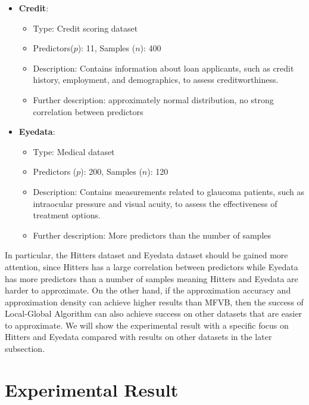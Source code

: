 \begin{itemize}
	\item \textbf{Credit}:
	\begin{itemize}
		\item Type: Credit scoring dataset
		\item Predictors($p$): 11, Samples ($n$): 400
		\item Description: Contains information about loan applicants, such as credit history, employment, and demographics, to assess creditworthiness.
		\item Further description: approximately normal distribution, no strong correlation between predictors
	\end{itemize}
	
	\item \textbf{Eyedata}:
	\begin{itemize}
		\item Type: Medical dataset
		\item Predictors ($p$): 200, Samples ($n$): 120
		\item Description: Contains measurements related to glaucoma patients, such as intraocular pressure and visual acuity, to assess the effectiveness of treatment options.
		\item Further description: More predictors than the number of samples
	\end{itemize}
\end{itemize}

In particular, the Hitters dataset and Eyedata dataset should be gained more attention, since Hitters has a large correlation between predictors while Eyedata has more predictors than a number of samples meaning Hitters and Eyedata are harder to approximate. On the other hand, if the approximation accuracy and approximation density can achieve higher results than MFVB, then the success of Local-Global Algorithm can also achieve success on other datasets that are easier to approximate. We will show the experimental result with a specific focus on Hitters and Eyedata compared with results on other datasets in the later subsection.

\section{Experimental Result}
